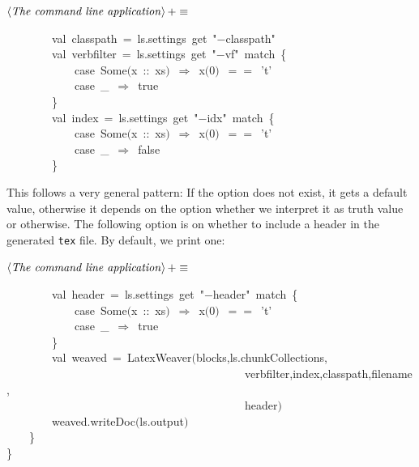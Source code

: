 \documentclass[a4paper,12pt]{article}
\begin{document}
$\left<\mbox{\emph{The command line application}}\right>+\equiv$
\begin{program}~~~~~~~~{\vem val}~classpath~=~ls.settings~get~"$-$classpath"
\\[0.5em]~~~~~~~~{\vem val}~verbfilter~=~ls.settings~get~"$-$vf"~{\vem match}~{\small\{}
\\~~~~~~~~~~~~{\vem case}~Some$($x~{\rm :}{\rm :}~xs$)$~$\Rightarrow$~x$($0$)$~$==$~'t'
\\~~~~~~~~~~~~{\vem case}~\_~$\Rightarrow$~{\vem true}
\\~~~~~~~~{\small\}}
\\[0.5em]~~~~~~~~{\vem val}~index~=~ls.settings~get~"$-$idx"~{\vem match}~{\small\{}
\\~~~~~~~~~~~~{\vem case}~Some$($x~{\rm :}{\rm :}~xs$)$~$\Rightarrow$~x$($0$)$~$==$~'t'
\\~~~~~~~~~~~~{\vem case}~\_~$\Rightarrow$~{\vem false}
\\~~~~~~~~{\small\}}
\\[0.5em]\end{program}
This follows a very general pattern: If the option does not exist, it
gets a default value, otherwise it depends on the option whether we interpret
it as truth value or otherwise. The following option is on whether to include
a header in the generated \texttt{tex} file. By default, we print one:

$\left<\mbox{\emph{The command line application}}\right>+\equiv$
\begin{program}~~~~~~~~{\vem val}~header~=~ls.settings~get~"$-$header"~{\vem match}~{\small\{}
\\~~~~~~~~~~~~{\vem case}~Some$($x~{\rm :}{\rm :}~xs$)$~$\Rightarrow$~x$($0$)$~$==$~'t'
\\~~~~~~~~~~~~{\vem case}~\_~$\Rightarrow$~{\vem true}
\\~~~~~~~~{\small\}}
\\[0.5em]~~~~~~~~{\vem val}~weaved~=~LatexWeaver$($blocks,ls.chunkCollections,
\\~~~~~~~~~~~~~~~~~~~~~~~~~~~~~~~~~~~~~~~~~~verbfilter,index,classpath,filename,
\\~~~~~~~~~~~~~~~~~~~~~~~~~~~~~~~~~~~~~~~~~~header$)$
\\[0.5em]~~~~~~~~weaved.writeDoc$($ls.output$)$
\\~~~~{\small\}}
\\{\small\}}
\\[0.5em]\end{program}
 \pagebreak
\end{document}
